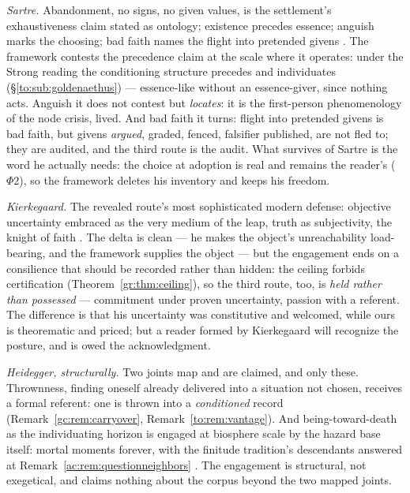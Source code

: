 \documentclass[11pt]{article}
\numberwithin{equation}{section}
\theoremstyle{plain}
\theoremstyle{definition}
\theoremstyle{remark}
\begin{document}
\emph{Sartre.} Abandonment, no signs, no given values, is the
settlement's exhaustiveness claim stated as ontology; existence
precedes essence; anguish marks the choosing; bad faith names the
flight into pretended givens \cite{Sartre46}. The framework contests
the precedence claim at the scale where it operates: under the Strong
reading the conditioning structure precedes and individuates
(\S\ref{to:sub:goldenaethus}) --- essence-like without an
essence-giver, since nothing acts. Anguish it does not contest but
\emph{locates}: it is the first-person phenomenology of the node
crisis, lived. And bad faith it turns: flight into pretended givens
is bad faith, but givens \emph{argued}, graded, fenced, falsifier
published, are not fled to; they are audited, and the third route
is the audit. What survives of Sartre is the word he actually needs:
the choice at adoption is real and remains the reader's
($\Phi2$), so the framework deletes his inventory and keeps his
freedom.

\emph{Kierkegaard.} The revealed route's most sophisticated modern
defense: objective uncertainty embraced as the very medium of the
leap, truth as subjectivity, the knight of faith
\cite{Kie1846}. The delta is clean --- he makes the object's
unreachability load-bearing, and the framework supplies the object
--- but the engagement ends on a consilience that should be recorded
rather than hidden: the ceiling forbids certification
(Theorem~\ref{gr:thm:ceiling}), so the third route, too, is
\emph{held rather than possessed} --- commitment under proven
uncertainty, passion with a referent. The difference is that his
uncertainty was constitutive and welcomed, while ours is theorematic
and priced; but a reader formed by Kierkegaard will recognize the
posture, and is owed the acknowledgment.

\emph{Heidegger, structurally.} Two joints map and are claimed, and
only these. Thrownness, finding oneself already delivered into a
situation not chosen, receives a formal referent: one is thrown
into a \emph{conditioned} record (Remark~\ref{gc:rem:carryover},
Remark~\ref{to:rem:vantage}). And being-toward-death as the
individuating horizon is engaged at biosphere scale by the hazard
base itself: mortal moments forever, with the finitude tradition's
descendants answered at Remark~\ref{ac:rem:questionneighbors}
\cite{Hei27}. The engagement is structural, not exegetical, and
claims nothing about the corpus beyond the two mapped joints.
\end{document}
